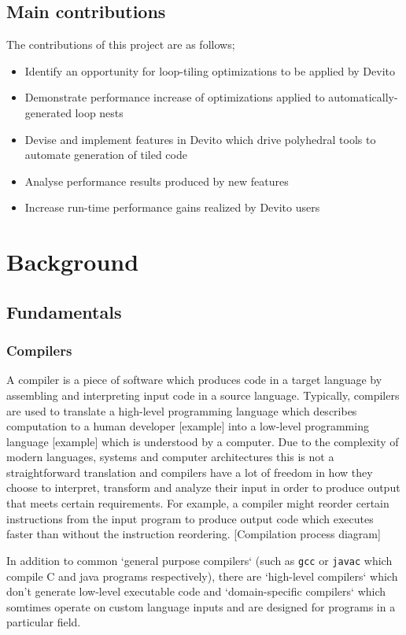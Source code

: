 \documentclass[a4paper,12pt,twoside]{report}
\begin{document}
\section{Main contributions}
The contributions of this project are as follows;
\begin{itemize}
	\item{Identify an opportunity for loop-tiling optimizations to be applied by Devito}
	\item{Demonstrate performance increase of optimizations applied to automatically-generated loop nests}
	\item{Devise and implement features in Devito which drive polyhedral tools to automate generation of tiled code}
	\item{Analyse performance results produced by new features}
	\item{Increase run-time performance gains realized by Devito users}
\end{itemize}

\chapter{Background}

\section{Fundamentals}
\subsection*{Compilers}
A compiler is a piece of software which produces code in a target language by assembling and interpreting input code in a source language.
Typically, compilers are used to translate a high-level programming language which describes computation to a human developer [example] into 
a low-level programming language [example] which is understood by a computer. Due to the complexity of modern languages, systems and computer
architectures this is not a straightforward translation and compilers have a lot of freedom in how they choose to interpret, transform and analyze
their input in order to produce output that meets certain requirements. For example, a compiler might reorder certain instructions from the input
program to produce output code which executes faster than without the instruction reordering.
[Compilation process diagram]

In addition to common `general purpose compilers` (such as \texttt{gcc} or \texttt{javac} which compile C and java programs respectively),
there are `high-level compilers` which don't generate low-level executable code and `domain-specific compilers` which somtimes operate on
custom language inputs and are designed for programs in a particular field.
\end{document}
